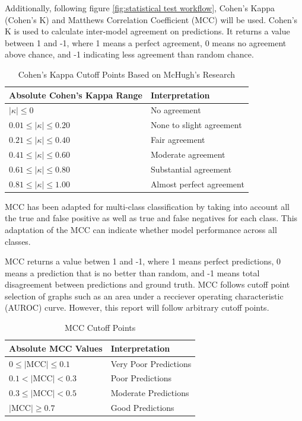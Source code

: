 \documentclass[10.7pt, onecolumn]{article}
\begin{document}
Additionally, following figure \ref{fig:statistical test workflow}, Cohen's Kappa (Cohen's K) and Matthews Correlation Coefficient (MCC) will be used. Cohen's K is used to calculate inter-model agreement on predictions. It returns a value between 1 and -1, where 1 means a perfect agreement, 0 means no agreement above chance, and -1 indicating less agreement than random chance.

\begin{table}[H]
  \centering
  \small
  \begin{tabular}{|p{4cm}|p{3cm}|}
    \hline
    \textbf{Absolute Cohen's Kappa Range} & \textbf{Interpretation} \\
    \hline
    $|\kappa| \leq 0$ & No agreement \\
    \hline
    $0.01 \leq |\kappa| \leq 0.20$ & None to slight agreement \\
    \hline
    $0.21 \leq |\kappa| \leq 0.40$ & Fair agreement \\
    \hline
    $0.41 \leq |\kappa| \leq 0.60$ & Moderate agreement \\
    \hline
    $0.61 \leq |\kappa| \leq 0.80$ & Substantial agreement \\
    \hline
    $0.81 \leq |\kappa| \leq 1.00$ & Almost perfect agreement \\
    \hline
  \end{tabular}
  \caption{Cohen's Kappa Cutoff Points Based on McHugh's Research \cite{cohen}}
  \label{tab:kappaInterpretation}
\end{table}

MCC has been adapted for multi-class classification by taking into account all the true and false positive as well as true and false negatives for each class\cite{mccmulticlass}. This adaptation of the MCC can indicate whether model performance across all classes.

MCC returns a value betwen 1 and -1, where 1 means perfect predictions, 0 means a prediction that is no better than random, and -1 means total disagreement between predictions and ground truth. MCC follows cutoff point selection of graphs such as an area under a recciever operating characteristic (AUROC) curve\cite{articlesss}\cite{Yang_Berdine_2017}. However, this report will follow arbitrary cutoff points.

\begin{table}[H]
  \centering
  \small
  \begin{tabular}{|p{4cm}|p{3cm}|}
    \hline
    \textbf{Absolute MCC Values} & \textbf{Interpretation} \\
    \hline
    $0 \leq |\text{MCC}| \leq 0.1$ & Very Poor Predictions \\
    \hline
    $0.1 < |\text{MCC}| < 0.3$ & Poor Predictions \\
    \hline
    $0.3 \leq |\text{MCC}| < 0.5$ & Moderate Predictions \\
    \hline
    $|\text{MCC}| \geq 0.7$ & Good Predictions \\
    \hline
  \end{tabular}
  \caption{MCC Cutoff Points}
  \label{tab:mccInterpretation}
\end{table}
\end{document}
